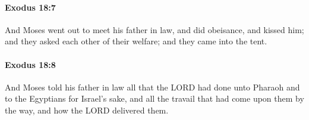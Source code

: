 		\paragraph{Exodus 18:7} %
			\label{EXODUS-18-7}

			And Moses went out to meet his father in law, and did obeisance, and kissed him; and they asked each other of their welfare; and they came into the tent.


		\paragraph{Exodus 18:8} %
			\label{EXODUS-18-8}

			And Moses told his father in law all that the LORD had done unto Pharaoh and to the Egyptians for Israel's sake, and all the travail that had come upon them by the way, and how the LORD delivered them.


